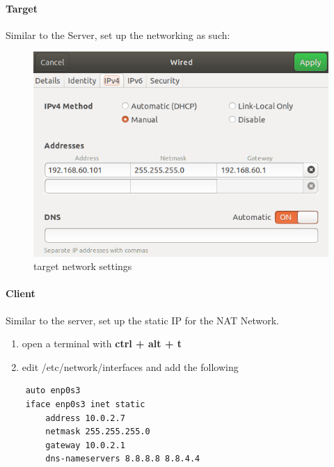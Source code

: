 \documentclass[12pt]{article}
\begin{document}
\paragraph{Target}
    
Similar to the Server, set up the networking as such:
    \begin{figure}[H]
        \begin{center}
            \includegraphics[scale=0.5]{setting_up_target_1.png}
        \end{center}{}
        \caption{target network settings}
        \label{fig:setting_up_target_1}
    \end{figure}


\paragraph{Client}

    Similar to the server, set up the static IP for the NAT Network.

    \begin{enumerate}
        \item open a terminal with \textbf{ctrl + alt + t}
        \item edit /etc/network/interfaces and add the following
    \end{enumerate}
    
    \begin{verbatim}
    auto enp0s3
    iface enp0s3 inet static
        address 10.0.2.7
        netmask 255.255.255.0
        gateway 10.0.2.1
        dns-nameservers 8.8.8.8 8.8.4.4
    \end{verbatim}
    
\end{document}
